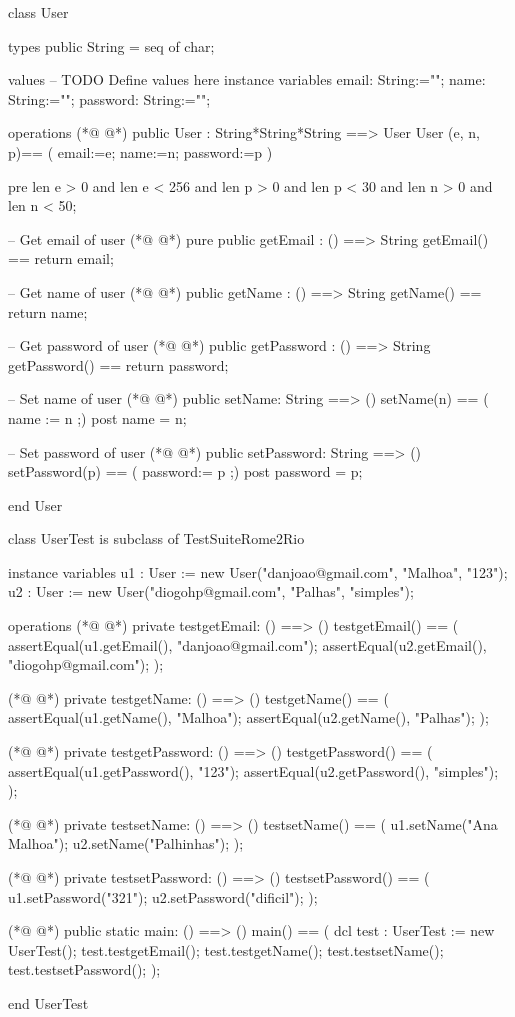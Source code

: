 \begin{vdmpp}[breaklines=true]
class User

types
public String = seq of char;

values
-- TODO Define values here
instance variables
 email: String:="";
 name: String:="";
 password: String:="";
 
operations
(*@
\label{User:14}
@*)
public User : String*String*String ==> User
User (e, n, p)== (
 email:=e;
 name:=n;
 password:=p
 )
 
 pre len e > 0 and len e < 256
  and len p > 0 and len p < 30
  and len n > 0 and len n < 50;
  
  -- Get email of user
(*@
\label{getEmail:26}
@*)
 pure public getEmail : () ==> String
 getEmail() == return email;
 
  -- Get name of user
(*@
\label{getName:30}
@*)
 public getName : () ==> String
 getName() == return name;
 
 -- Get password of user
(*@
\label{getPassword:34}
@*)
 public getPassword : () ==> String
 getPassword() == return password;
 
 -- Set name of user
(*@
\label{setName:38}
@*)
 public setName: String ==> ()
 setName(n) == (
  name := n
 ;)
 post name = n;
 
 -- Set password of user
(*@
\label{setPassword:45}
@*)
 public setPassword: String ==> ()
 setPassword(p) == (
  password:= p
 ;)
 post password = p;
 

end User

class UserTest is subclass of TestSuiteRome2Rio

 instance variables
 u1 :  User := new User("danjoao@gmail.com", "Malhoa", "123");
 u2 : User := new User("diogohp@gmail.com", "Palhas", "simples");
 
 operations
(*@
\label{testgetEmail:61}
@*)
  private testgetEmail: () ==> ()
   testgetEmail() == (
    assertEqual(u1.getEmail(), "danjoao@gmail.com");
    assertEqual(u2.getEmail(), "diogohp@gmail.com");
   );
   
(*@
\label{testgetName:67}
@*)
   private testgetName: () ==> ()
   testgetName() == (
    assertEqual(u1.getName(), "Malhoa");
    assertEqual(u2.getName(), "Palhas");
   );
   
(*@
\label{testgetPassword:73}
@*)
   private testgetPassword: () ==> ()
   testgetPassword() == (
    assertEqual(u1.getPassword(), "123");
    assertEqual(u2.getPassword(), "simples");
   );
   
(*@
\label{testsetName:79}
@*)
    private testsetName: () ==> ()
   testsetName() == (
    u1.setName("Ana Malhoa");
    u2.setName("Palhinhas");
   );
   
(*@
\label{testsetPassword:85}
@*)
   private testsetPassword: () ==> ()
   testsetPassword() == (
    u1.setPassword("321");
    u2.setPassword("dificil");
   );
   
   
(*@
\label{main:92}
@*)
 public static main: () ==> ()
      main() ==
      (
       dcl test : UserTest := new UserTest();
       test.testgetEmail();
       test.testgetName();
       test.testsetName();
       test.testsetPassword();
       );
       
end UserTest
\end{vdmpp}
